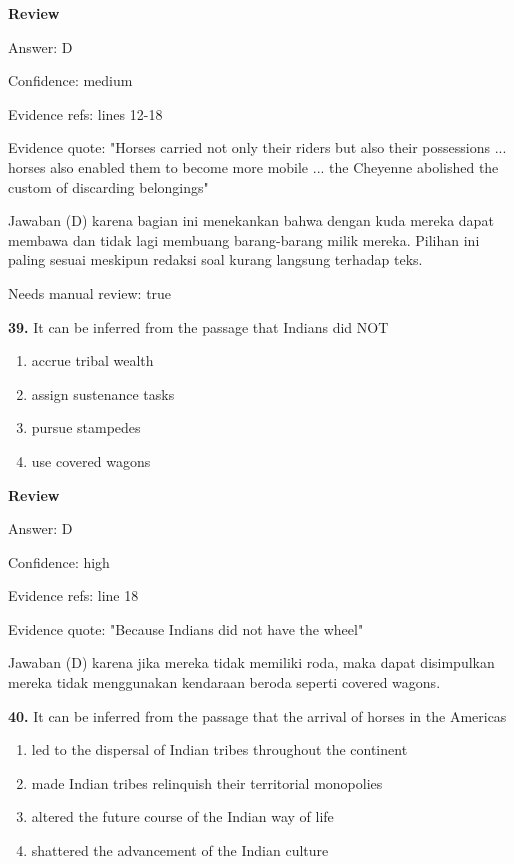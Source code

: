 \documentclass[12pt]{article}
\begin{document}
\par
\begingroup
\setlength{\parskip}{0pt}
\setlength{\parindent}{0pt}
\textbf{Review}\par
Answer: D\par
Confidence: medium\par
Evidence refs: lines 12-18\par
Evidence quote: "Horses carried not only their riders but also their possessions ... horses also enabled them to become more mobile ... the Cheyenne abolished the custom of discarding belongings"\par
Jawaban (D) karena bagian ini menekankan bahwa dengan kuda mereka dapat membawa dan tidak lagi membuang barang-barang milik mereka. Pilihan ini paling sesuai meskipun redaksi soal kurang langsung terhadap teks.\par
Needs manual review: true\par
\endgroup
\par
\vspace{0.25\baselineskip}
\noindent\textbf{39.} It can be inferred from the passage that Indians did NOT
\begin{enumerate}[label=(\Alph*),leftmargin=*,itemsep=0.2em]
\item accrue tribal wealth
\item assign sustenance tasks
\item pursue stampedes
\item use covered wagons
\end{enumerate}
\par
\begingroup
\setlength{\parskip}{0pt}
\setlength{\parindent}{0pt}
\textbf{Review}\par
Answer: D\par
Confidence: high\par
Evidence refs: line 18\par
Evidence quote: "Because Indians did not have the wheel"\par
Jawaban (D) karena jika mereka tidak memiliki roda, maka dapat disimpulkan mereka tidak menggunakan kendaraan beroda seperti covered wagons.\par
\endgroup
\par
\vspace{0.25\baselineskip}
\noindent\textbf{40.} It can be inferred from the passage that the arrival of horses in the Americas
\begin{enumerate}[label=(\Alph*),leftmargin=*,itemsep=0.2em]
\item led to the dispersal of Indian tribes throughout the continent
\item made Indian tribes relinquish their territorial monopolies
\item altered the future course of the Indian way of life
\item shattered the advancement of the Indian culture
\end{enumerate}
\end{document}
